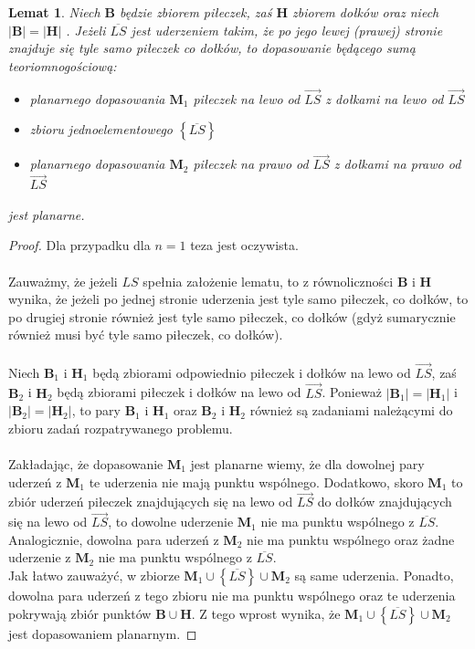 \documentclass[10pt,a4paper]{article}
\newtheorem{lemma}{Lemat}
\begin{document}
	\begin{lemma}\label{lemma:1}
		Niech $\mathbf{B}$ będzie zbiorem piłeczek, zaś $\mathbf{H}$ zbiorem dołków oraz niech $|\mathbf{B}| = |\mathbf{H}|$ . Jeżeli $\overline{LS}$ jest uderzeniem takim, że po jego lewej (prawej) stronie znajduje się tyle samo piłeczek co dołków, to dopasowanie będącego sumą teoriomnogościową:
		\begin{itemize}
			\item planarnego dopasowania $\mathbf{M}_{1}$ piłeczek na lewo od $\overrightarrow{LS}$ z dołkami na lewo od $\overrightarrow{LS}$
			\item zbioru jednoelementowego $\left\{\overline{LS}\right\}$
			\item planarnego dopasowania $\mathbf{M}_{2}$ piłeczek na prawo od $\overrightarrow{LS}$ z dołkami na prawo od $\overrightarrow{LS}$
		\end{itemize}
		jest planarne.
	\end{lemma}

	\begin{proof}
		Dla przypadku dla $n = 1$  teza jest oczywista. \\~\\
		Zauważmy, że jeżeli $LS$ spełnia założenie lematu, to z równoliczności $\mathbf{B}$ i $\mathbf{H}$ wynika, że jeżeli po jednej stronie uderzenia jest tyle samo piłeczek, co dołków, to po drugiej stronie również jest tyle samo piłeczek, co dołków (gdyż sumarycznie również musi być tyle samo piłeczek, co dołków). \\~\\
		Niech $\mathbf{B}_{1}$ i $\mathbf{H}_{1}$ będą zbiorami odpowiednio piłeczek i dołków na lewo od $\overrightarrow{LS}$, zaś $\mathbf{B}_{2}$ i $\mathbf{H}_{2}$ będą zbiorami piłeczek i dołków na lewo od $\overrightarrow{LS}$. Ponieważ $|\mathbf{B}_{1}| = |\mathbf{H}_{1}|$ i $|\mathbf{B}_{2}| = |\mathbf{H}_{2}|$, to pary $\mathbf{B}_{1}$ i $\mathbf{H}_{1}$ oraz $\mathbf{B}_{2}$ i $\mathbf{H}_{2}$ również są zadaniami należącymi do zbioru zadań rozpatrywanego problemu. \\~\\
		Zakładając, że dopasowanie $\mathbf{M}_{1}$ jest planarne wiemy, że dla dowolnej pary uderzeń z $\mathbf{M}_{1}$ te uderzenia nie mają punktu wspólnego. Dodatkowo, skoro $\mathbf{M}_{1}$ to zbiór uderzeń piłeczek znajdujących się na lewo od $\overrightarrow{LS}$ do dołków znajdujących się na lewo od $\overrightarrow{LS}$, to dowolne uderzenie $\mathbf{M}_{1}$ nie ma punktu wspólnego z $\overline{LS}$. Analogicznie, dowolna para uderzeń z $\mathbf{M}_{2}$ nie ma punktu wspólnego oraz żadne uderzenie z $\mathbf{M}_{2}$ nie ma punktu wspólnego z $\overline{LS}$. \\
		Jak łatwo zauważyć, w zbiorze $\mathbf{M}_{1} \cup \left\{\overline{LS}\right\} \cup \mathbf{M}_{2}$ są same uderzenia. Ponadto, dowolna para uderzeń z tego zbioru nie ma punktu wspólnego oraz te uderzenia pokrywają zbiór punktów $\mathbf{B} \cup \mathbf{H}$. Z tego wprost wynika, że $\mathbf{M}_{1} \cup \left\{\overline{LS}\right\} \cup \mathbf{M}_{2}$ jest dopasowaniem planarnym.
	\end{proof}
\end{document}

